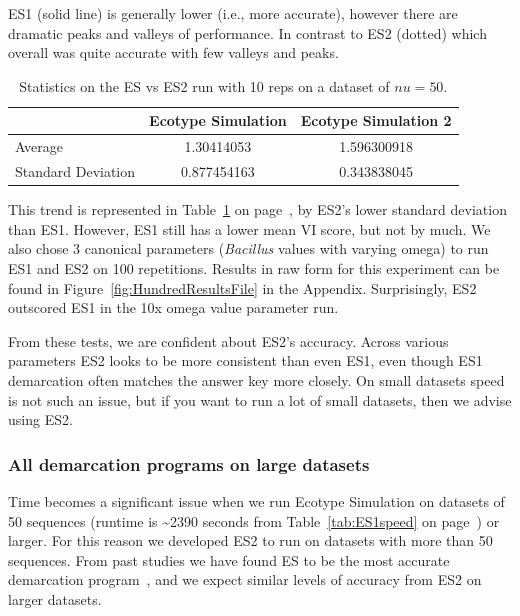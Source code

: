 ES1 (solid line) is generally lower (i.e., more accurate), however there are dramatic peaks and valleys of performance.
In contrast to ES2 (dotted) which overall was quite accurate with few valleys and peaks.
\begin{table}
    \begin{tabular}{l|cc}
    ~                  & Ecotype Simulation & Ecotype Simulation 2 \\ \hline
    Average            & 1.30414053         & 1.596300918          \\
    Standard Deviation & 0.877454163        & 0.343838045          \\
    \end{tabular}
    \caption[ES versus ES2 statistics.]{Statistics on the ES vs ES2 run with 10 reps on a dataset of $nu=50$.}
    \label{tab:ESvES2mean}
\end{table}
This trend is represented in Table~\ref{tab:ESvES2mean} on page~\pageref{tab:ESvES2mean}, by ES2's lower standard deviation than ES1.
However, ES1 still has a lower mean VI score, but not by much.
We also chose 3 canonical parameters (\emph{Bacillus} values with varying omega) to run ES1 and ES2 on 100 repetitions.
Results in raw form for this experiment can be found in Figure~\ref{fig:HundredResultsFile} in the Appendix.
Surprisingly, ES2 outscored ES1 in the 10x omega value parameter run.

From these tests, we are confident about ES2's accuracy.
Across various parameters ES2 looks to be more consistent than even ES1, even though ES1 demarcation often matches the answer key more closely.
On small datasets speed is not such an issue, but if you want to run a lot of small datasets, then we advise using ES2.

\subsubsection*{All demarcation programs on large datasets}
Time becomes a significant issue when we run Ecotype Simulation on datasets of 50 sequences (runtime is \textasciitilde2390 seconds from Table~\ref{tab:ES1speed} on page~\pageref{tab:ES1speed}) or larger.
For this reason we developed ES2 to run on datasets with more than 50 sequences.
From past studies we have found ES to be the most accurate demarcation program~\cite{carlo}, and we expect similar levels of accuracy from ES2 on larger datasets.

